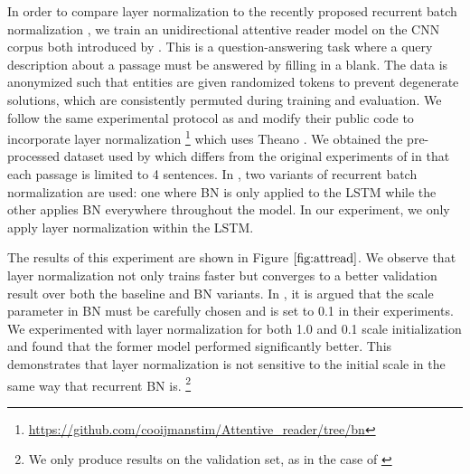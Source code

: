 \documentclass{article}
\begin{document}
In order to compare layer normalization to the recently proposed recurrent batch normalization \citep{cooijmans2016recurrent}, we train an unidirectional attentive reader model on the CNN corpus both introduced by \citet{hermann2015teaching}. This is a question-answering task where a query description about a passage must be answered by filling in a blank. The data is anonymized such that entities are given randomized tokens to prevent degenerate solutions, which are consistently permuted during training and evaluation. We follow the same experimental protocol as \citet{cooijmans2016recurrent} and modify their public code to incorporate layer normalization \footnote{\url{https://github.com/cooijmanstim/Attentive_reader/tree/bn}} which uses Theano \citep{team2016theano}. We obtained the pre-processed dataset used by \citet{cooijmans2016recurrent} which differs from the original experiments of \citet{hermann2015teaching} in that each passage is limited to 4 sentences. In \citet{cooijmans2016recurrent}, two variants of recurrent batch normalization are used: one where BN is only applied to the LSTM while the other applies BN everywhere throughout the model. In our experiment, we only apply layer normalization within the LSTM.

The results of this experiment are shown in Figure $\ref{fig:attread}$. We observe that layer normalization not only trains faster but converges to a better validation result over both the baseline and BN variants. In \citet{cooijmans2016recurrent}, it is argued that the scale parameter in BN must be carefully chosen and is set to 0.1 in their experiments. We experimented with layer normalization for both 1.0 and 0.1 scale initialization and found that the former model performed significantly better. This demonstrates that layer normalization is not sensitive to the initial scale in the same way that recurrent BN is. \footnote{We only produce results on the validation set, as in the case of \citet{cooijmans2016recurrent}}
\end{document}
